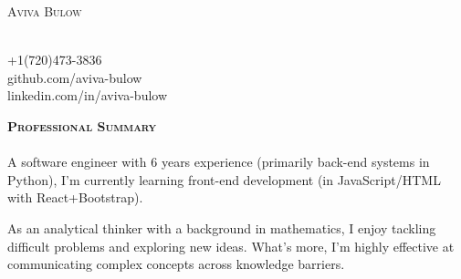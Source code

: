 \documentclass{article}
\newcommand{\lineunder}{\vspace*{-8pt} \\ \hspace*{-18pt} \hrulefill \\}
\newcommand{\header}[1]{{\vspace*{8pt}\hspace*{-16pt} \textsc{\textbf{\large{#1}}}} \vspace*{4pt} \lineunder \vspace*{4pt}}
\newcommand{\contact}[5]{
\begin{multicols}{2}
    \raggedcolumns
    \begin{flushleft}
    { \Huge \scshape {#1}}\\
    \end{flushleft}
    
\columnbreak

    \begin{flushright}
    #2 \\ #3 \\
    #4 \\ #5 \\
    \end{flushright}

\end{multicols}

}
\begin{document}
\small

\contact{Aviva Bulow}{}{+1(720)473-3836}{github.com/aviva-bulow}{linkedin.com/in/aviva-bulow}

\vspace{-10pt}

\header{Professional Summary}
A software engineer with 6 years experience (primarily back-end systems in Python), I'm currently learning front-end development (in JavaScript/HTML with React+Bootstrap).

As an analytical thinker with a background in mathematics, I enjoy tackling difficult problems and exploring new ideas. What's more, I'm highly effective at communicating complex concepts across knowledge barriers. 
\end{document}
